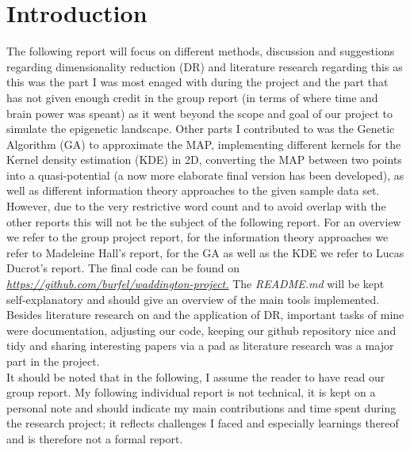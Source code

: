 \documentclass[journal, a4paper]{IEEEtran}
\begin{document}
\section{Introduction}
The following report will focus on different methods, discussion and suggestions regarding dimensionality reduction (DR) and literature research regarding this as this was the part I was most enaged with during the project and the part that has not given enough credit in the group report (in terms of where time and brain power was speant) as it went beyond the scope and goal of our project to simulate the epigenetic landscape.
Other parts I contributed to was the Genetic Algorithm (GA) to approximate the MAP, implementing different kernels for the Kernel density estimation (KDE) in 2D, converting the MAP between two points into a quasi-potential (a now more elaborate final version has been developed), as well as different information theory approaches to the given sample data set. However, due to the very restrictive word count and to avoid overlap with the other reports this will not be the subject of the following report. For an overview we refer to the group project report, for the information theory approaches we refer to Madeleine Hall's report, for the GA as well as the KDE we refer to Lucas Ducrot's report. The final code can be found on 
\textit{\url{https://github.com/burfel/waddington-project.}}
The \textit{README.md} will be kept self-explanatory and should give an overview of the main tools implemented. \\
Besides literature research on and the application of DR, important tasks of mine were documentation, adjusting our code, keeping our github repository nice and tidy and sharing interesting papers via a pad as literature research was a major part in the project. \\

It should be noted that in the following, I assume the reader to have read our group report. My following individual report is not technical, it is kept on a personal note and should indicate my main contributions and time spent during the research project; it reflects challenges I faced and especially learnings thereof and is therefore not a formal report.  \\
\end{document}
